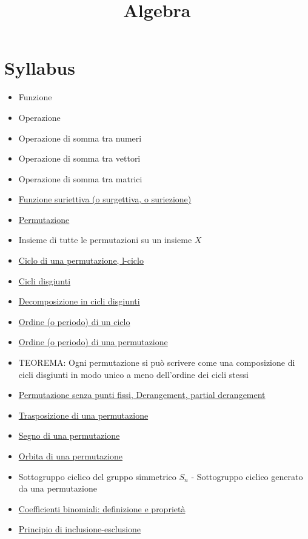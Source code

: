\documentclass[a4paper,10pt]{article}
\title{Algebra}
\author{}
\begin{document}
\maketitle

\section{Syllabus}
\begin{itemize}
 \item Funzione
 \item Operazione
 \item Operazione di somma tra numeri
 \item Operazione di somma tra vettori
 \item Operazione di somma tra matrici
 \item \href{./FunzioneSuriettiva.html}{Funzione suriettiva (o surgettiva, o suriezione)} 
 \item \href{./Permutazione.html}{Permutazione}
 \item Insieme di tutte le permutazioni su un insieme $X$
 \item \href{./PermutazioneCicli.html}{Ciclo di una permutazione, l-ciclo}
 \item \href{./PermutazioniDisgiunte.html}{Cicli disgiunti}
 \item \href{./PermutazioneDecomposizioneCicli.html}{Decomposizione in cicli disgiunti}
 \item \href{./PermutazioneCicliPeriodo.html}{Ordine (o periodo) di un ciclo}
 \item \href{./PermutazionePeriodo.html}{Ordine (o periodo) di una permutazione}
 \item TEOREMA: Ogni permutazione si può scrivere come una composizione di cicli disgiunti in modo unico a meno dell'ordine dei cicli stessi
 \item \href{./Derangement.html}{Permutazione senza punti fissi, Derangement, partial derangement}
 \item \href{./PermutazioneTrasposizione.html}{Trasposizione di una permutazione}
 \item \href{./PermutazioneSegno.html}{Segno di una permutazione}
 \item \href{./PermutazioneOrbita.html}{Orbita di una permutazione}
 \item Sottogruppo ciclico del gruppo simmetrico $S_n$ - Sottogruppo ciclico generato da una permutazione
 \item \href{./CoefficientiBinomiali.html}{Coefficienti binomiali: definizione e proprietà}
 \item \href{./PrincipioInclusioneEsclusione.html}{Principio di inclusione-esclusione}
 

\end{itemize}
\end{document}
